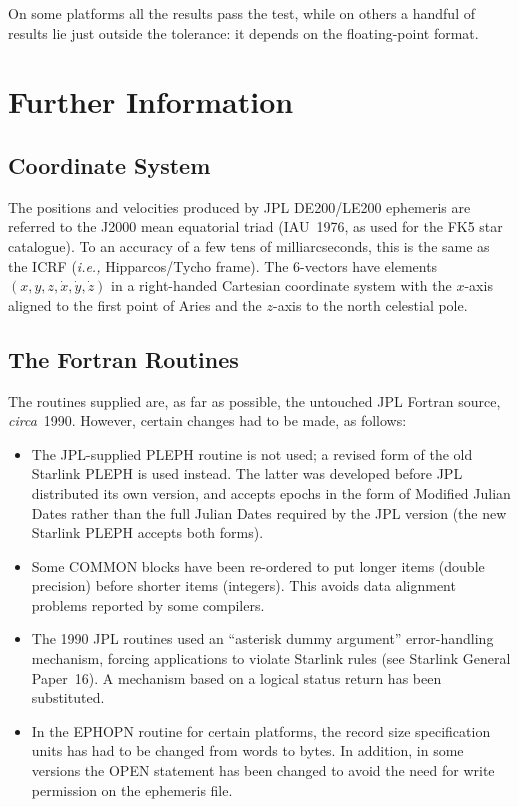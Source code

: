 \documentclass[twoside,11pt]{article}
\newcommand{\xlabel}[1]{}
\renewcommand{\_}{\texttt{\symbol{95}}}
\begin{document}
On some platforms all the results pass the test, while on others a
handful of results lie just outside the tolerance:  it depends on the
floating-point format.

\section{\xlabel{further_information}Further Information}
\label{further_information}

\subsection{\xlabel{coordinate_system}Coordinate System}
\label{coordinate_system}

The positions and velocities produced by JPL DE200/LE200 ephemeris are
referred to the J2000 mean equatorial triad (IAU~1976, as used for the
FK5 star catalogue).  To an accuracy of a few tens of milliarcseconds,
this is the same as the ICRF (\emph{i.e.,}\/ Hipparcos/Tycho frame).
The 6-vectors have elements $( x, y, z, \dot{x},
\dot{y}, \dot{z} )$ in a right-handed Cartesian coordinate system with
the $x$-axis aligned to the first point of Aries and the $z$-axis to
the north celestial pole.

\subsection{\xlabel{the_fortran_routines}The Fortran Routines}
\label{the_fortran_routines}

The routines supplied are, as far as possible, the untouched JPL Fortran
source, \textit{circa}\/~1990.  However, certain changes had to be made,
as follows:

\begin{itemize}

\item The JPL-supplied PLEPH routine is not used;  a revised form of the
old Starlink PLEPH is used instead.  The latter was developed before JPL
distributed its own version, and accepts epochs in the form of Modified
Julian Dates rather than the full Julian Dates required by the JPL version
(the new Starlink PLEPH accepts both forms).

\item Some COMMON blocks have been re-ordered to put longer items (double
precision) before shorter items (integers).  This avoids data alignment
problems reported by some compilers.

\item The 1990 JPL routines used an ``asterisk dummy argument''
error-handling mechanism, forcing applications to violate Starlink rules
(see Starlink General Paper~16).  A mechanism based on a logical status
return has been substituted.

\item In the EPHOPN routine for certain platforms, the record size
specification units has had to be changed from words to bytes.
In addition, in some versions the OPEN statement has been changed to
avoid the need for write permission on the ephemeris file.  \end{itemize}
\end{document}
